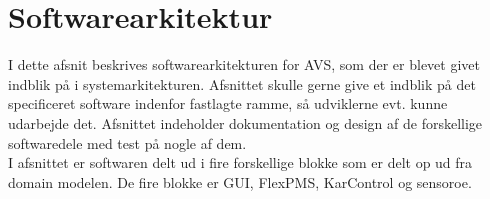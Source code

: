 
\chapter{Softwarearkitektur}


I dette afsnit beskrives softwarearkitekturen for \gls{AVS}, som der er blevet givet indblik på i systemarkitekturen. Afsnittet skulle gerne give et indblik på det specificeret software indenfor fastlagte ramme, så udviklerne evt. kunne udarbejde det. Afsnittet indeholder dokumentation og design af de forskellige softwaredele med test på nogle af dem. \\
I afsnittet er softwaren delt ud i fire forskellige blokke som er delt op ud fra domain modelen. De fire blokke er GUI, FlexPMS, KarControl og \gls{sensoroe}. 


\newpage

\newpage

\newpage

\newpage

\newpage
